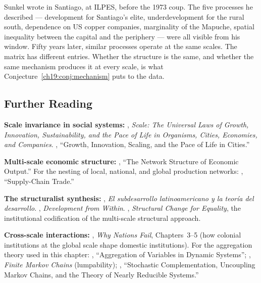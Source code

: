 \documentclass[../structural_economics_book.tex]{subfiles}
\begin{document}
Sunkel wrote in Santiago, at ILPES, before the 1973 coup. The five processes he described --- development for Santiago's elite, underdevelopment for the rural south, dependence on US copper companies, marginality of the Mapuche, spatial inequality between the capital and the periphery --- were all visible from his window. Fifty years later, similar processes operate at the same scales. The matrix has different entries. Whether the structure is the same, and whether the same mechanism produces it at every scale, is what Conjecture~\ref{ch19:conj:mechanism} puts to the data.


\subsection*{Further Reading}

\textbf{Scale invariance in social systems:} \citet{west2017scale}, \textit{Scale: The Universal Laws of Growth, Innovation, Sustainability, and the Pace of Life in Organisms, Cities, Economies, and Companies}. \citet{bettencourt2007growth}, ``Growth, Innovation, Scaling, and the Pace of Life in Cities.''

\textbf{Multi-scale economic structure:} \citet{hausmann2011network}, ``The Network Structure of Economic Output.'' For the nesting of local, national, and global production networks: \citet{baldwin2015supply}, ``Supply-Chain Trade.''

\textbf{The structuralist synthesis:} \citet{sunkel1970subdesarrollo}, \textit{El subdesarrollo latinoamericano y la teor\'{i}a del desarrollo}. \citet{sunkel1993development}, \textit{Development from Within}. \citet{cepal2012structural}, \textit{Structural Change for Equality}, the institutional codification of the multi-scale structural approach.

\textbf{Cross-scale interactions:} \citet{acemoglu2012why}, \textit{Why Nations Fail}, Chapters~3--5 (how colonial institutions at the global scale shape domestic institutions). For the aggregation theory used in this chapter: \citet{simon1961aggregation}, ``Aggregation of Variables in Dynamic Systems''; \citet{kemeny1960finite}, \textit{Finite Markov Chains} (lumpability); \citet{meyer1989stochastic}, ``Stochastic Complementation, Uncoupling Markov Chains, and the Theory of Nearly Reducible Systems.''
\end{document}
